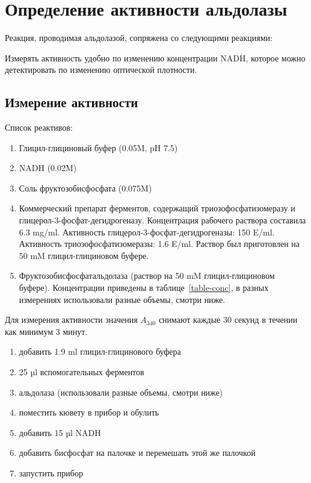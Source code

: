 \section{Определение активности альдолазы}

Реакция, проводимая альдолазой, сопряжена со следующими реакциями:

\def\svgwidth{0.6\linewidth}

Измерять активность удобно по изменению концентрации NADH,
которое можно детектировать по изменению оптической плотности.

\subsection{Измерение активности}
\label{activeness}
\label{bisphosphate}
Список реактивов:
\begin{enumerate}
\item Глицил-глициновый буфер (0.05M, pH 7.5)
\item NADH (0.02M)
\item Соль фруктозобисфосфата (0.075M)
\item Коммерческий препарат ферментов, содержащий триозофосфатизомеразу и
    глицерол-3-фосфат-дегидрогеназу.
    Концентрация рабочего раствора составила 6.3 mg/ml.
    Активность глицерол-3-фосфат-дегидрогеназы: 150 E/ml.
    Активность триозофосфатизомеразы: 1.6 E/ml.
    Раствор был приготовлен на 50 mM глицил-глициновом буфере.
\item Фруктозобисфосфатальдолаза (раствор на 50 mM глицил-глициновом буфере).
    Концентрации приведены в таблице~\ref{table-conc},
    в разных измерениях использовали разные объемы, смотри ниже.
\end{enumerate}

Для измерения активности значения $A_{340}$ снимают каждые 30 секунд
в течении как минимум 3 минут.
\begin{enumerate}
\item добавить 1.9 ml глицил-глицинового буфера
\item 25 µl вспомогательных ферментов
\item альдолаза (использовали разные объемы, смотри ниже)
\item поместить кювету в прибор и обулить
\item добавить 15 µl NADH
\item добавить бисфосфат на палочке и перемешать этой же палочкой
\item запустить прибор
\end{enumerate}

